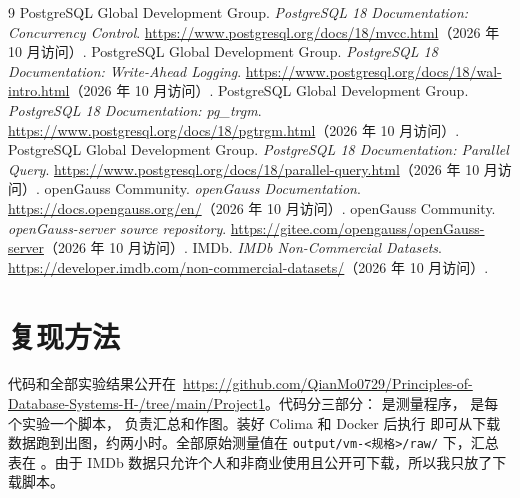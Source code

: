 \documentclass[UTF8,a4paper,zihao=5,fontset=none]{ctexart}
\newcommand{\code}[1]{\texttt{#1}}
\begin{document}
\begin{thebibliography}{9}\small
{} PostgreSQL Global Development Group. \emph{PostgreSQL 18 Documentation: Concurrency Control}. \url{https://www.postgresql.org/docs/18/mvcc.html}（2026 年 10 月访问）.
 PostgreSQL Global Development Group. \emph{PostgreSQL 18 Documentation: Write-Ahead Logging}. \url{https://www.postgresql.org/docs/18/wal-intro.html}（2026 年 10 月访问）.
 PostgreSQL Global Development Group. \emph{PostgreSQL 18 Documentation: pg\_trgm}. \url{https://www.postgresql.org/docs/18/pgtrgm.html}（2026 年 10 月访问）.
 PostgreSQL Global Development Group. \emph{PostgreSQL 18 Documentation: Parallel Query}. \url{https://www.postgresql.org/docs/18/parallel-query.html}（2026 年 10 月访问）.
 openGauss Community. \emph{openGauss Documentation}. \url{https://docs.opengauss.org/en/}（2026 年 10 月访问）.
 openGauss Community. \emph{openGauss-server source repository}. \url{https://gitee.com/opengauss/openGauss-server}（2026 年 10 月访问）.
 IMDb. \emph{IMDb Non-Commercial Datasets}. \url{https://developer.imdb.com/non-commercial-datasets/}（2026 年 10 月访问）.
\end{thebibliography}

\appendix
\section{复现方法}

代码和全部实验结果公开在\ {\def\UrlBreaks{\do\/\do\-}\url{https://github.com/QianMo0729/Principles-of-Database-Systems-H-/tree/main/Project1}}。代码分三部分： 是测量程序， 是每个实验一个脚本， 负责汇总和作图。装好 Colima 和 Docker 后执行  即可从下载数据跑到出图，约两小时。全部原始测量值在 \code{output/vm-<规格>/raw/} 下，汇总表在 。由于 IMDb 数据只允许个人和非商业使用且公开可下载，所以我只放了下载脚本。
\end{document}
